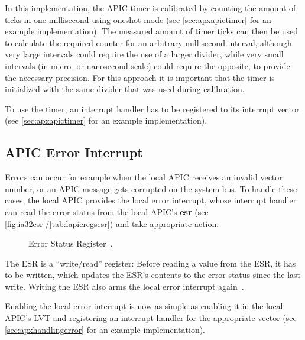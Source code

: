 In this implementation, the APIC timer is calibrated by counting the amount of ticks in one
millisecond using oneshot mode (see \autoref{sec:apxapictimer} for an example implementation). The
measured amount of timer ticks can then be used to calculate the required counter for an arbitrary
millisecond interval, although very large intervals could require the use of a larger divider,
while very small intervals (in micro- or nanosecond scale) could require the opposite, to provide
the necessary precision. For this approach it is important that the timer is initialized with the
same divider that was used during calibration.

To use the timer, an interrupt handler has to be registered to its interrupt vector (see
\autoref{sec:apxapictimer} for an example implementation).

\subsection{APIC Error Interrupt}
\label{subsec:lapicerror}

Errors can occur for example when the local APIC receives an invalid vector number, or an APIC
message gets corrupted on the system bus. To handle these cases, the local APIC provides the local
error interrupt, whose interrupt handler can read the error status from the local APIC's
\textbf{\gls{esr}} (see \autoref{fig:ia32esr}/\autoref{tab:lapicregsesr}) and take appropriate
action.

\begin{figure}[h]
  \centering
  \begin{subfigure}[b]{0.7\textwidth}
    
  \end{subfigure}
  \caption{Error Status Register~\cite[sec.~3.11.5.3]{ia32}.}
  \label{fig:ia32esr}
\end{figure}

The ESR is a ``write/read'' register: Before reading a value from the ESR, it has to be written,
which updates the ESR's contents to the error status since the last write. Writing the ESR also
arms the local error interrupt again~\cite[sec.~3.11.5.3]{ia32}.

Enabling the local error interrupt is now as simple as enabling it in the local APIC's LVT and
registering an interrupt handler for the appropriate vector (see \autoref{sec:apxhandlingerror} for
an example implementation).

\clearpage

